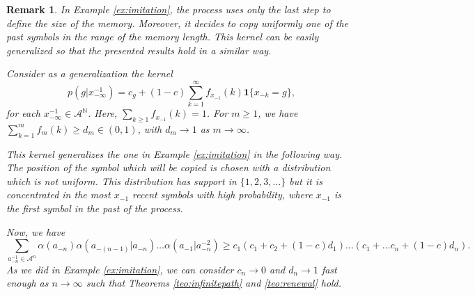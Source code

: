 \documentclass[a4paper]{article}
\newtheorem{remark}{Remark}%
\newtheorem{example}[theorem]{Example}
\newcommand{\N}{\mathbb{N}}
\newcommand{\A}{\mathcal{A}}
\begin{document}
\begin{remark} \label{rem:imitationexample}
In Example \ref{ex:imitation}, the process uses only the last step to define the size of the memory. Moreover, it decides to copy uniformly one of the past symbols in the range of the memory length. This kernel can be easily generalized so that the presented results hold in a similar way.

Consider as a generalization the kernel
\begin{equation}\label{eq:bramson-kalikow3}
p(g|x_{-\infty}^{-1})=c_g+(1-c)\sum_{k=1}^{\infty}f_{x_{-1}}(k)\mathbf{1}\{x_{-k}=g\},
\end{equation}
for each $x^{-1}_{-\infty}\in \A^{\N}$. Here, $\sum_{k\geq 1}f_{x_{-1}}(k)=1$. 
For $m\geq 1$, we have  $\sum_{k=1}^{m}f_{m}(k)\geq d_m \in (0,1)$, with $d_m\to 1$ as $m\to \infty$.

This kernel generalizes the one in Example \ref{ex:imitation} in the following way. The position of the symbol which will be copied is chosen with a distribution which is not uniform. This distribution has support in $\{1,2,3,\ldots\}$ but it is concentrated in the most $x_{-1}$ recent symbols with high probability, where $x_{-1}$ is the first symbol in the past of the
process.

Now, we have
$$
\sum_{a_{-n}^{-1}\in \A^n}\alpha(a_{-n})\alpha(a_{-(n-1)}|a_{-n})\ldots \alpha(a_{-1}|a_{-n}^{-2})\geq c_1(c_1+c_2+(1-c)d_1)\ldots (c_1+\ldots c_n+(1-c)d_n) .
$$
As we did in Example \ref{ex:imitation}, we can consider $c_n \to 0$ and $d_n\to 1$ fast enough as $n\to \infty$ such that Theorems \ref{teo:infinitepath} and \ref{teo:renewal} hold.

\end{remark}

\end{document}
